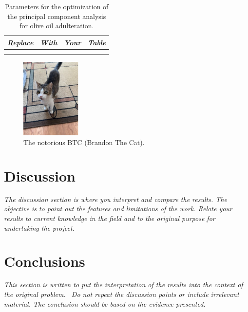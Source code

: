 \documentclass[11pt,a4paper,oneside]{report}
\newcommand{\instructions}[1]{{\color{black}\itshape #1}}
\begin{document}
\begin{table}[htbp]
\centering
\begin{tabular}{@{}llll@{}}
\toprule
\emph{Replace} & \emph{With} & \emph{Your} & \emph{Table} \\
\midrule
& & & \\
& & & \\
\bottomrule
\end{tabular}
\caption{Parameters for the optimization of the principal component analysis for
olive oil adulteration.}
\label{tbl:2}  
\end{table}


\begin{figure}[htbp]
\centering
\includegraphics[height=4cm]{btc.jpg}
\caption{The notorious BTC (Brandon The Cat).}
\label{fig:1}
\end{figure}


\chapter{Discussion}
\label{discussion}

\instructions{The discussion section is where you interpret and compare the
results. The objective is to point out the features and limitations of
the work. Relate your results to current knowledge in the field and to
the original purpose for undertaking the project.}


\chapter{Conclusions}
\label{conclusions}

\instructions{This section is written to put the interpretation of the results
into the context of the original problem.~ Do not repeat the discussion
points or include irrelevant material. The conclusion should be based on
the evidence presented.}
\end{document}
